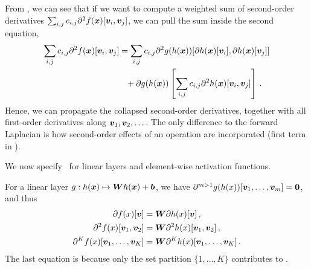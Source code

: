 From , we can see that if we want to compute a weighted sum of second-order derivatives $\sum_{i,j} c_{i,j} \partial^2 f({\bm{x}})[{\bm{v}}_i, {\bm{v}}_j]$, we can pull the sum inside the second equation,
\begin{align}\label{eq:taylor-mode-multi-directional-1-2-sum-inside}
  \begin{split}
    \sum_{i,j} c_{i,j} \partial^2 f({\bm{x}}) [{\bm{v}}_i, {\bm{v}}_j]
    &=
      \sum_{i,j} c_{i,j} \partial^2 g(h({\bm{x}})) [\partial h({\bm{x}}) [{\bm{v}}_i], \partial h({\bm{x}}) [{\bm{v}}_j]]
    \\
    &\phantom{=}+
      \partial g(h({\bm{x}}))
      \left[
      \sum_{i,j} c_{i,j}
      \partial^2 h({\bm{x}}) [{\bm{v}}_i, {\bm{v}}_j]
      \right]\,.
  \end{split}
\end{align}
Hence, we can propagate the collapsed second-order derivatives, together with all first-order derivatives along ${\bm{v}}_1, {\bm{v}}_2, \dots$. The only difference to the forward Laplacian is how second-order effects of an operation are incorporated (first term in ).

We now specify~ for linear layers and element-wise activation functions.

For a linear layer $g: h({\bm{x}}) \mapsto {\bm{W}} h({\bm{x}}) + {\bm{b}}$, we have $\partial^{m>1}g(h(x))[{\bm{v}}_1, \dots, {\bm{v}}_m] = {\bm{0}}$, and thus
\begin{subequations}\label{eq:taylor-mode-multi-directional-1-2-linear}
  \begin{align}
    \partial f(x) [{\bm{v}}]
    &=
      {\bm{W}} \partial h(x) [{\bm{v}}]\,,
    \\
    \partial^2 f(x) [{\bm{v}}_1, {\bm{v}}_2]
    &=
      {\bm{W}} \partial^2 h(x) [{\bm{v}}_1, {\bm{v}}_2]\,,
    \\
    \partial^K f(x) [{\bm{v}}_1, \dots, {\bm{v}}_K]
    &=
      {\bm{W}} \partial^K h(x) [{\bm{v}}_1, \dots, {\bm{v}}_K]\,.
  \end{align}
\end{subequations}
The last equation is because only the set partition $\{1, \dots, K\}$ contributes to .

